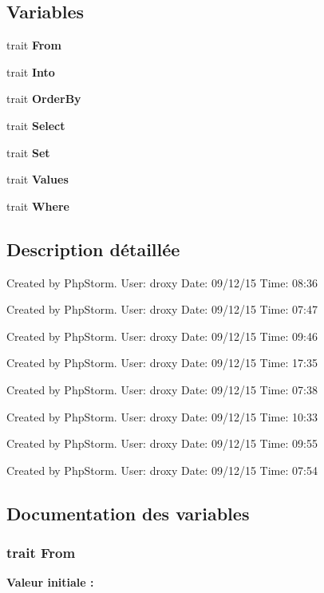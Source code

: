 \subsection*{Variables}
\begin{DoxyCompactItemize}
\item 
trait {\bfseries From}
\item 
trait {\bfseries Into}
\item 
trait {\bfseries Order\+By}
\item 
trait {\bfseries Select}
\item 
trait {\bfseries Set}
\item 
trait {\bfseries Values}
\item 
trait {\bfseries Where}
\end{DoxyCompactItemize}


\subsection{Description détaillée}
Created by Php\+Storm. User\+: droxy Date\+: 09/12/15 Time\+: 08\+:36

Created by Php\+Storm. User\+: droxy Date\+: 09/12/15 Time\+: 07\+:47

Created by Php\+Storm. User\+: droxy Date\+: 09/12/15 Time\+: 09\+:46

Created by Php\+Storm. User\+: droxy Date\+: 09/12/15 Time\+: 17\+:35

Created by Php\+Storm. User\+: droxy Date\+: 09/12/15 Time\+: 07\+:38

Created by Php\+Storm. User\+: droxy Date\+: 09/12/15 Time\+: 10\+:33

Created by Php\+Storm. User\+: droxy Date\+: 09/12/15 Time\+: 09\+:55

Created by Php\+Storm. User\+: droxy Date\+: 09/12/15 Time\+: 07\+:54 

\subsection{Documentation des variables}
\subsubsection[{\texorpdfstring{From}{From}}]{\setlength{\rightskip}{0pt plus 5cm}trait From}\hypertarget{namespace_o_r_m_1_1_query_builder_1_1_clause_ac622f0c806974d877f2a7a4c2db9d251}{}\label{namespace_o_r_m_1_1_query_builder_1_1_clause_ac622f0c806974d877f2a7a4c2db9d251}
{\bfseries Valeur initiale \+:}


